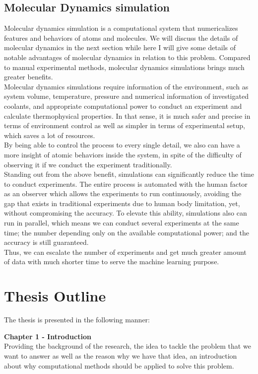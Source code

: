 \subsection{Molecular Dynamics simulation}
Molecular dynamics simulation is a computational system that numericalizes 
features and behaviors of atoms and molecules. We will discuss the details 
of molecular dynamics in the next section while here I will give some details 
of notable advantages of molecular dynamics in relation to this problem. 
Compared to manual experimental methods, molecular dynamics simulations 
brings much greater benefits.\\
Molecular dynamics simulations require information of the environment, 
such as system volume, temperature, pressure and numerical information 
of investigated coolants, and appropriate computational power to conduct 
an experiment and calculate thermophysical properties. In that sense, 
it is much safer and precise in terms of environment control as well as 
simpler in terms of experimental setup, which saves a lot of resources.\\
By being able to control the process to every single detail, we also can have 
a more insight of atomic behaviors inside the system, in spite of the 
difficulty of observing it if we conduct the experiment traditionally.\\
Standing out from the above benefit, simulations can significantly reduce the 
time to conduct experiments. The entire process is automated with the human 
factor as an observer which allows the experiments to run continuously, 
avoiding the gap that exists in traditional experiments due to human body 
limitation, yet, without compromising the accuracy. To elevate this ability, 
simulations also can run in parallel, which means we can conduct several 
experiments at the same time; the number depending only on the available 
computational power; and the accuracy is still guaranteed.\\
Thus, we can escalate the number of experiments and get much greater amount 
of data with much shorter time to serve the machine learning purpose.
\newpage\section{Thesis Outline}
The thesis is presented in the following manner:

\textbf{Chapter 1 - Introduction} 
\\Providing the background of the research, the idea 
to tackle the problem that we want to answer as well as the reason why 
we have that idea, an introduction about why computational methods should 
be applied to solve this problem.


